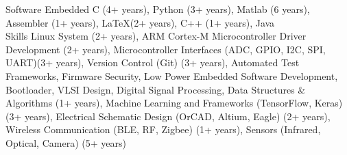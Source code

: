 

\begin{cvskills}


\cvskill
    {Software} %
    {Embedded C (4+ years), Python (3+ years), Matlab (6 years), Assembler (1+ years), 
    \LaTeX (2+ years), C++ (1+ years), Java}
\\
\cvskill
    {Skills} %
    {Linux System (2+ years), ARM Cortex-M Microcontroller Driver Development (2+ years), 
    Microcontroller Interfaces (ADC, GPIO, I2C, SPI, UART)(3+ years), Version Control (Git) (3+ years), 
    Automated Test Frameworks, Firmware Security, Low Power Embedded Software Development, 
    Bootloader, VLSI Design, Digital Signal Processing, Data Structures \& Algorithms (1+ years),
    Machine Learning and Frameworks (TensorFlow, Keras) (3+ years),
    Electrical Schematic Design (OrCAD, Altium, Eagle) (2+ years),
    Wireless Communication (BLE, RF, Zigbee) (1+ years),
    Sensors (Infrared, Optical, Camera) (5+ years) }

\end{cvskills}
